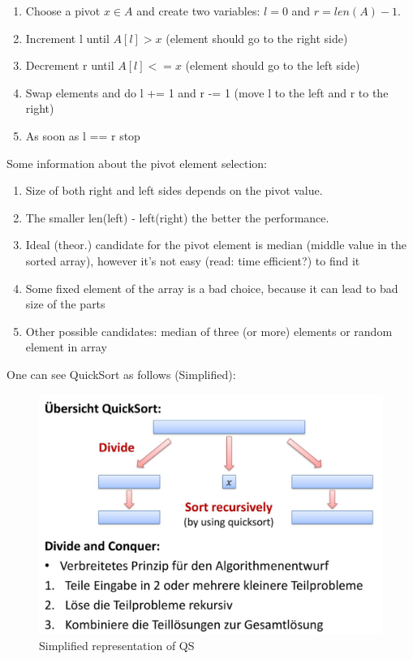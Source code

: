 \documentclass[a4paper,
  twoside, %
  headlines=2.1 %
  ]{scrartcl}
\begin{document}
    \begin{enumerate}
        \item Choose a pivot $x \in A$ and create two variables: $l = 0$ and $r = len(A) - 1$.
        \item Increment l until $A[l] > x$ (element should go to the right side)
        \item Decrement r until $A[l] <= x$ (element should go to the left side)
        \item Swap elements and do l += 1  and r -= 1 (move l to the left and r to the right)
        \item As soon as l == r stop
    \end{enumerate}
    Some information about the pivot element selection:
    \begin{enumerate}
        \item Size of both right and left sides depends on the pivot value.
        \item The smaller len(left) - left(right) the better the performance.
        \item Ideal (theor.) candidate for the pivot element is median (middle value in the sorted array), however it's not easy (read: time efficient?) to find it
        \item Some fixed element of the array is a bad choice, because it can lead to bad size of the parts
        \item Other possible candidates: median of three (or more) elements or random element in array \\
    \end{enumerate}

    One can see QuickSort as follows (Simplified):
    
    \begin{figure}[H]
        \centering
        \includegraphics[width=0.5\linewidth]{quick_sort_simplyfied.png}
        \caption{Simplified representation of QS}
        \label{fig:enter-label}
    \end{figure}
    
\end{document}
